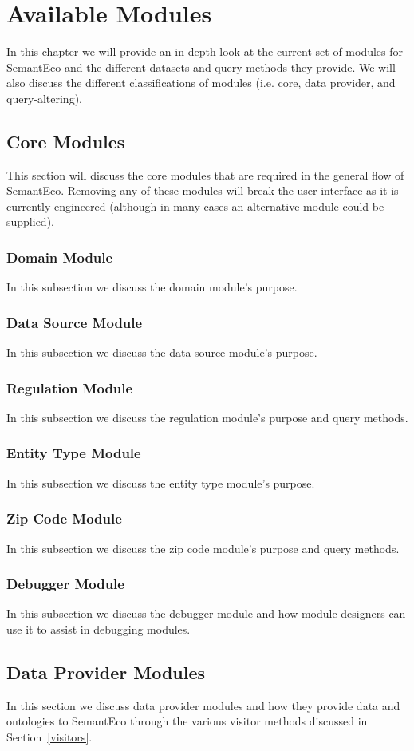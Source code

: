 \documentclass[letterpaper]{report}
\begin{document}
\chapter{Available Modules}
In this chapter we will provide an in-depth look at the current set of modules for SemantEco and the different datasets and query methods they provide. We will also discuss the different classifications of modules (i.e. core, data provider, and query-altering).
\section{Core Modules}
This section will discuss the core modules that are required in the general flow of SemantEco. Removing any of these modules will break the user interface as it is currently engineered (although in many cases an alternative module could be supplied).
\subsection{Domain Module}
In this subsection we discuss the domain module's purpose.
\subsection{Data Source Module}
In this subsection we discuss the data source module's purpose.
\subsection{Regulation Module}
In this subsection we discuss the regulation module's purpose and query methods.
\subsection{Entity Type Module}
In this subsection we discuss the entity type module's purpose.
\subsection{Zip Code Module}
In this subsection we discuss the zip code module's purpose and query methods.
\subsection{Debugger Module}
In this subsection we discuss the debugger module and how module designers can use it to assist in debugging modules.
\section{Data Provider Modules}
In this section we discuss data provider modules and how they provide data and ontologies to SemantEco through the various visitor methods discussed in Section~\ref{visitors}.
\end{document}
